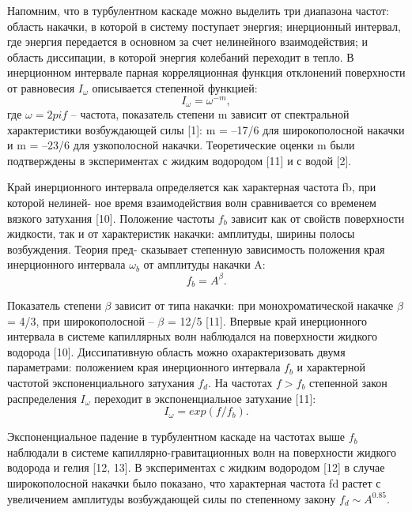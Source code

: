 Напомним, что в турбулентном каскаде можно выделить три диапазона частот: область накачки, в которой в систему поступает энергия; инерционный интервал, где энергия передается в основном за счет нелинейного взаимодействия; и область диссипации, в которой энергия колебаний переходит в тепло. В инерционном интервале парная корреляционная функция отклонений поверхности от равновесия $I_\omega$ описывается степенной функцией:
\begin{equation}
I_\omega = \omega^{-m},
\end{equation}
где $\omega = 2 pi f$ – частота, показатель степени m зависит от спектральной характеристики возбуждающей силы [1]: m = –17/6 для широкополосной накачки и m = –23/6 для узкополосной накачки. Теоретические оценки m были подтверждены в экспериментах с жидким водородом [11] и с водой [2].

Край инерционного интервала определяется как характерная частота fb, при которой нелиней- ное время взаимодействия волн сравнивается со временем вязкого затухания [10]. Положение частоты $f_b$ зависит как от свойств поверхности жидкости, так и от характеристик накачки: амплитуды, ширины полосы возбуждения. Теория пред- сказывает степенную зависимость положения края инерционного интервала $\omega_b$ от амплитуды накачки A:
\begin{equation}
f_b = A^{\beta}.
\end{equation}

Показатель степени $\beta$ зависит от типа накачки: при монохроматической накачке $\beta$ = 4/3, при широкополосной – $\beta$ = 12/5 [11]. Впервые край инерционного интервала в системе капиллярных волн наблюдался на поверхности жидкого водорода [10].
Диссипативную область можно охарактеризовать двумя параметрами: положением края инерционного интервала $f_b$ и характерной частотой экспоненциального затухания $f_d$. На частотах $f > f_b$ степенной закон распределения $I_\omega$ переходит в экспоненциальное затухание [11]:
\begin{equation}
I_\omega = exp(f/f_b).
\end{equation}


Экспоненциальное падение в турбулентном каскаде на частотах выше $f_b$ наблюдали в системе капиллярно-гравитационных волн на поверхности жидкого водорода и гелия [12, 13]. В экспериментах с жидким водородом [12] в случае широкополосной накачки было показано, что характерная частота fd растет с увеличением амплитуды возбуждающей силы по степенному закону $f_d \sim A^{0.85}$.

